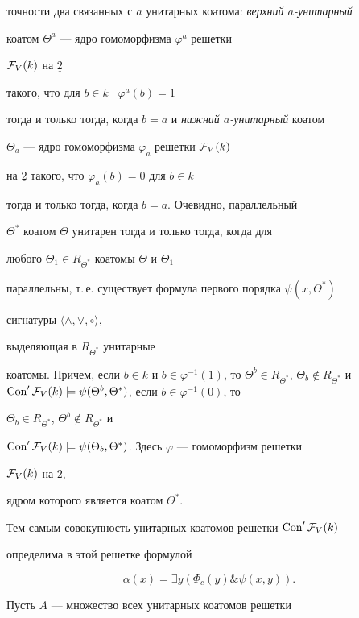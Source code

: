 \begin{pf}
точности два связанных с $a$ унитарных коатома: {\it верхний $a$-унитарный}


коатом $\Theta^a$ --- ядро гомоморфизма $\varphi^a$ решетки 


${\cal F}_V(k)$ на $\underline{2}$


такого, что для $b\in k$ \ $\varphi^a(b)=1$


тогда и только тогда, когда $b=a$ и {\it нижний $a$-унитарный} коатом


$\Theta_a$ --- ядро гомоморфизма $\varphi_a$ решетки ${\cal F}_V(k)$


на $\underline{2}$ такого, что $\varphi_a(b)=0$ для $b\in k$ 


тогда и только тогда, когда $b=a$. Очевидно, параллельный


$\Theta^{*}$ коатом $\Theta$ унитарен тогда и только тогда, когда для


любого $\Theta_1\in R_{\Theta^{*}}$ коатомы $\Theta$ и $\Theta_1$


параллельны, т.\,е. существует формула первого порядка $\psi(x,\Theta^{*})$


сигнатуры $\langle\wedge,\vee,\circ\rangle$,


выделяющая в $R_{\Theta^{*}}$ унитарные


коатомы. Причем, если $b\in k$ и $b\in \varphi^{-1}(1)$, то $\Theta^{b}


\in R_{\Theta^{*}}$, $\Theta_b\notin R_{\Theta^{*}}$ и $\Con '{\cal F}_V(k)


\models\psi(\Theta^b,\Theta^{*})$, если $b\in \varphi^{-1}(0)$, то


$\Theta_b\in R_{\Theta^{*}}$, $\Theta^b\notin R_{\Theta^{*}}$ и 


$\Con '{\cal F}_V(k)


\models\psi(\Theta_b,\Theta^{*})$. Здесь $\varphi$ --- гомоморфизм решетки


${\cal F}_V(k)$ на $\underline{2}$,


ядром которого является коатом $\Theta^{*}$.


Тем самым совокупность унитарных коатомов решетки $\operatorname{Con} '{\cal F}_V(k)$


определима в этой решетке формулой


$$


\alpha(x)=\exists y(\Phi_c(y)\&\psi(x,y)).


$$





Пусть $A$ --- множество всех унитарных коатомов решетки



\end{pf}
